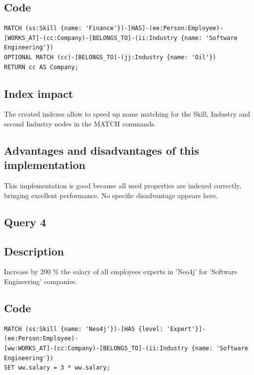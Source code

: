 \documentclass[a4paper, 11pt, titlepage]{article}
\begin{document}
\subsection* {Code}

\begin{verbatim}
MATCH (ss:Skill {name: 'Finance'})-[HAS]-(ee:Person:Employee)-
[WORKS_AT]-(cc:Company)-[BELONGS_TO]-(ii:Industry {name: 'Software Engineering'})
OPTIONAL MATCH (cc)-[BELONGS_TO]-(jj:Industry {name: 'Oil'})
RETURN cc AS Company;
\end{verbatim}


\subsection* {Index impact}

\noindent
The created indexes allow to speed up name matching for the Skill, Industry and second Industry nodes in the MATCH commands.


\subsection* {Advantages and disadvantages of this implementation}

\noindent
This implementation is good because all used properties are indexed correctly, bringing excellent performance. No specific disadvantage appears here.


\subsection {Query 4}

\subsection* {Description}

\noindent
Increase by 200 \% the salary of all employees experts in 'Neo4j' for 'Software Engineering' companies.


\subsection* {Code}

\begin{verbatim}
MATCH (ss:Skill {name: 'Neo4j'})-[HAS {level: 'Expert'}]-(ee:Person:Employee)-
[ww:WORKS_AT]-(cc:Company)-[BELONGS_TO]-(ii:Industry {name: 'Software Engineering'})
SET ww.salary = 3 * ww.salary;
\end{verbatim}
\end{document}
